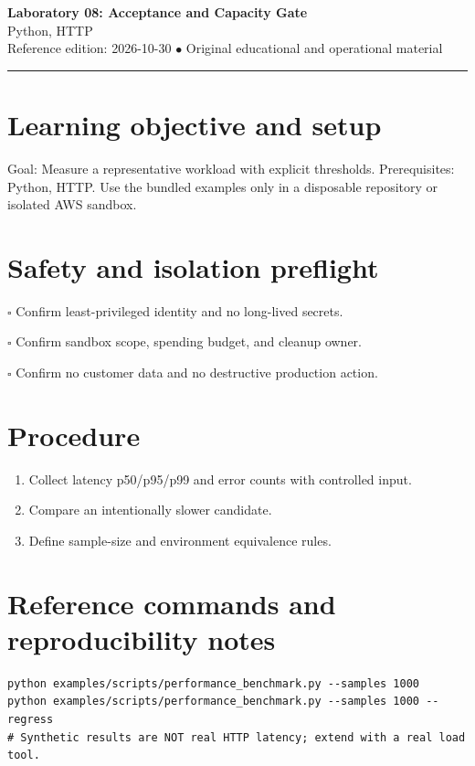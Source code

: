\documentclass[10pt,letterpaper]{article}
\begin{document}
\begin{center}
{\LARGE\bfseries\color{cdblue}Laboratory 08: Acceptance and Capacity Gate}\\[7pt]
{\large Python, HTTP}\\[6pt]
{\small Reference edition: 2026-10-30 $\bullet$ Original educational and operational material}
\end{center}
\noindent\color{cdblue}\rule{\linewidth}{1.2pt}\color{black}
\vspace{0.4em}
\section{Learning objective and setup}
Goal: Measure a representative workload with explicit thresholds. Prerequisites: Python, HTTP. Use the bundled examples only in a disposable repository or isolated AWS sandbox.


\section{Safety and isolation preflight}
\noindent $\square$ Confirm least-privileged identity and no long-lived secrets.\par\vspace{0.35em}
\noindent $\square$ Confirm sandbox scope, spending budget, and cleanup owner.\par\vspace{0.35em}
\noindent $\square$ Confirm no customer data and no destructive production action.\par\vspace{0.35em}

\section{Procedure}
\begin{enumerate}
\item Collect latency p50/p95/p99 and error counts with controlled input.
\item Compare an intentionally slower candidate.
\item Define sample-size and environment equivalence rules.
\end{enumerate}

\section{Reference commands and reproducibility notes}
\begin{verbatim}
python examples/scripts/performance_benchmark.py --samples 1000
python examples/scripts/performance_benchmark.py --samples 1000 --regress
# Synthetic results are NOT real HTTP latency; extend with a real load tool.
\end{verbatim}
\end{document}
